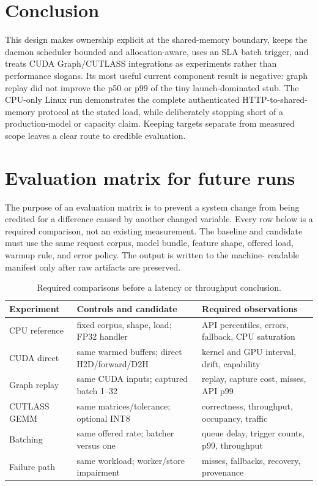 \documentclass[10pt,a4paper,twocolumn]{article}
\begin{document}
\section{Conclusion}
This design makes ownership explicit at the shared-memory boundary, keeps the
daemon scheduler bounded and allocation-aware, uses an SLA batch trigger, and
treats CUDA Graph/CUTLASS integrations as experiments rather than performance
slogans. Its most useful current component result is negative: graph replay did
not improve the p50 or p99 of the tiny launch-dominated stub. The CPU-only Linux
run demonstrates the complete authenticated HTTP-to-shared-memory protocol at
the stated load, while deliberately stopping short of a production-model or
capacity claim. Keeping targets separate from measured scope leaves a clear
route to credible evaluation.

\section{Evaluation matrix for future runs}
The purpose of an evaluation matrix is to prevent a system change from being
credited for a difference caused by another changed variable. Every row below
is a required comparison, not an existing measurement. The baseline and
candidate must use the same request corpus, model bundle, feature shape, offered
load, warmup rule, and error policy. The output is written to the machine-
readable manifest only after raw artifacts are preserved.

\begin{table}[t]\centering\scriptsize
\caption{Required comparisons before a latency or throughput conclusion.}\label{tab:matrix}
\begin{tabularx}{\columnwidth}{@{}lY Y@{}}\toprule
Experiment & Controls and candidate & Required observations \\\midrule
CPU reference & fixed corpus, shape, load; FP32 handler & API percentiles, errors, fallback, CPU saturation \\
CUDA direct & same warmed buffers; direct H2D/forward/D2H & kernel and GPU interval, drift, capability \\
Graph replay & same CUDA inputs; captured batch 1--32 & replay, capture cost, misses, API p99 \\
CUTLASS GEMM & same matrices/tolerance; optional INT8 & correctness, throughput, occupancy, traffic \\
Batching & same offered rate; batcher versus one & queue delay, trigger counts, p99, throughput \\
Failure path & same workload; worker/store impairment & misses, fallbacks, recovery, provenance \\\bottomrule
\end{tabularx}\end{table}
\end{document}
